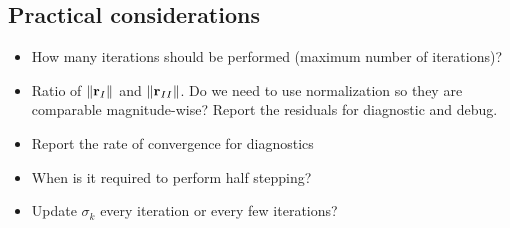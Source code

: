 \documentclass{article}
\begin{document}
\subsection{Practical considerations}
\begin{itemize}
    \item How many iterations should be performed (maximum number of iterations)?
    \item Ratio of $\|{\bf r}_I\|$ and $\|{\bf r}_{II}\|$. Do we need to use normalization so they are comparable magnitude-wise? Report the residuals for diagnostic and debug.
    \item Report the rate of convergence for diagnostics
    \item When is it required to perform half stepping?
    \item Update $\sigma_k$ every iteration or every few iterations?
\end{itemize}
\end{document}
